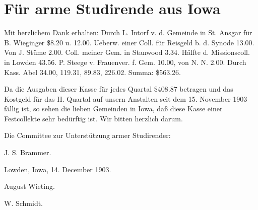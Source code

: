 \chapter[Für arme Studirende aus Iowa]{Für arme Studirende aus Iowa}

Mit herzlichem Dank erhalten: Durch L. Intorf v. d. Gemeinde in St. Ansgar für B. Wieginger \$8.20 u. 12.00. Ueberw. einer Coll. für Reisgeld b. d. Synode 13.00. Von J. Stüme 2.00. Coll. meiner Gem. in Stanwood 3.34. Hälfte d. Missionscoll. in Lowden 43.56. P. Steege v. Frauenver. f. Gem. 10.00, von N. N. 2.00. Durch Kass. Abel 34.00, 119.31, 89.83, 226.02. Summa: \$563.26.

Da die Ausgaben dieser Kasse für jedes Quartal \$408.87 betragen und das Kostgeld für das II. Quartal auf unsern Anstalten seit dem 15. November 1903 fällig ist, so sehen die lieben Gemeinden in Iowa, daß diese Kasse einer Festcollekte sehr bedürftig ist. Wir bitten herzlich darum.

Die Committee zur Unterstützung armer Studirender:

J. S. Brammer.

Lowden, Iowa, 14. December 1903.

August Wieting.

W. Schmidt.
